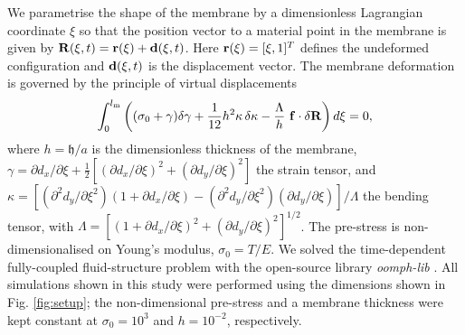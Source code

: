 \documentclass[aps,prl,reprint,superscriptaddress,floatfix]{revtex4-1}
\begin{document}
We parametrise the shape of the membrane by a dimensionless
Lagrangian coordinate $\xi$ so that the position vector
to a material point in the membrane is
given by ${\bf R}(\xi,t) = {\bf r}(\xi) + {\bf d}(\xi,t)$. Here ${\bf
  r}(\xi) = [\xi, 1]^T$ defines the undeformed configuration and $
{\bf d}(\xi,t)$ is the displacement vector. The membrane
deformation is governed by the principle of virtual displacements
\begin{equation}
\label{eq:virtualdisplacement}
\int_{0}^{l_\text{m}} \left((\sigma_0 + \gamma)\delta \gamma
+ \frac{1}{12}h^2\kappa \,\delta\kappa -
\frac{\Lambda}{h} \ {\bf f} \cdot \delta {\bf R} \right) d\xi = 0,
\end{equation}
where $h=\mathfrak{h}/a$ is the dimensionless thickness of the membrane,
$\gamma=\partial d_x/\partial {\xi} + \frac{1}{2}[(\partial d_x/\partial
  {\xi})^2 + (\partial d_y/\partial {\xi})^2]$ the strain tensor, and
$\kappa = [(\partial^2 d_y/\partial {\xi^2})(1+\partial d_x/\partial
  {\xi}) - (\partial^2 d_y/\partial {{\xi}^2}) (\partial d_y/\partial
  {\xi})]/\Lambda$ the bending tensor, with $\Lambda=[(1+\partial
  d_x/\partial \xi)^2+(\partial d_y/\partial {\xi})^2]^{1/2}$.
The pre-stress is non-dimensionalised on Young's modulus, $\sigma_0 = T/E$. 
We solved the time-dependent fully-coupled fluid-structure problem with
the open-source library \emph{oomph-lib} \cite{OOmph,heil2006}.
All simulations shown in this study were performed using the
dimensions shown in Fig. \ref{fig:setup}; the non-dimensional pre-stress
and a membrane thickness were kept constant at $ \sigma_0 =10^3$ 
and $h=10^{-2}$, respectively.
\end{document}
